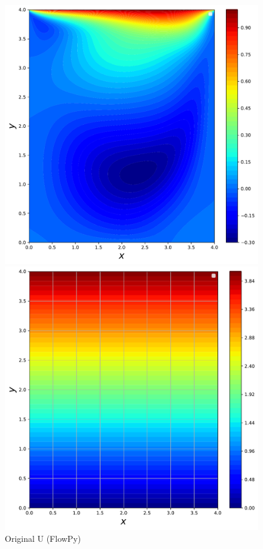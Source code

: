 \documentclass{article}
\begin{document}
	\begin{figure}[htb!]
		\includegraphics[width=\linewidth]{./images/Re400FlowPy_u}
		\caption{Original U (FlowPy)}
		\label{fig:u_oigin}
		\endminipage\hfill
		\includegraphics[width=\linewidth]{./images/Re400BoxFlowNet_pred_u}

\end{figure}
\end{document}
